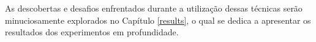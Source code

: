 As descobertas e desafios enfrentados durante a utilização dessas técnicas serão minuciosamente explorados no Capítulo \ref{results}, o qual se dedica a apresentar os resultados dos experimentos em profundidade.





